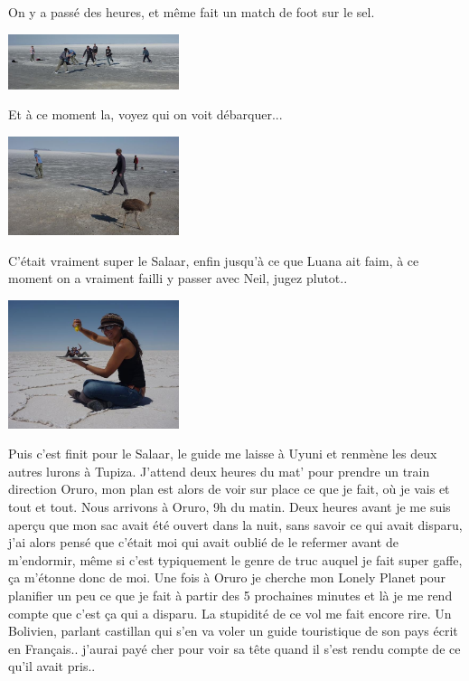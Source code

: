 \begin{multicols}{2}
On y a passé des heures, et même fait un match de foot sur le sel.

\smallbreak
\hspace*{-0.65cm}
\includegraphics[width=5cm]{articles/La-paz-humahuaca-et-salaar/12573870691BvG.jpg}
\smallbreak

Et à ce moment la, voyez qui on voit débarquer...

\smallbreak
\hspace*{-0.65cm}
\includegraphics[width=5cm]{articles/La-paz-humahuaca-et-salaar/1257387056akBO.jpg}
\smallbreak

C'était vraiment super le Salaar, enfin jusqu'à ce que Luana ait faim, à ce moment on a vraiment failli y passer avec Neil, jugez plutot..

\smallbreak
\hspace*{-0.65cm}
\includegraphics[width=5cm]{articles/La-paz-humahuaca-et-salaar/12572036252qaK.jpg}
\smallbreak

Puis c'est finit pour le Salaar, le guide me laisse à Uyuni et renmène les deux autres lurons à Tupiza. J'attend deux heures du mat' pour prendre un train direction Oruro, mon plan est alors de voir sur place ce que je fait, où je vais et tout et tout. Nous arrivons à Oruro, 9h du matin. Deux heures avant je me suis aperçu que mon sac avait été ouvert dans la nuit, sans savoir ce qui avait disparu, j'ai alors pensé que c'était moi qui avait oublié de le refermer avant de m'endormir, même si c'est typiquement le genre de truc auquel je fait super gaffe, ça m'étonne donc de moi. Une fois à Oruro je cherche mon Lonely Planet pour planifier un peu ce que je fait à partir des 5 prochaines minutes et là je me rend compte que c'est ça qui a disparu. La stupidité de ce vol me fait encore rire. Un Bolivien, parlant castillan qui s'en va voler un guide touristique de son pays écrit en Français.. j'aurai payé cher pour voir sa tête quand il s'est rendu compte de ce qu'il avait pris..


\end{multicols}
